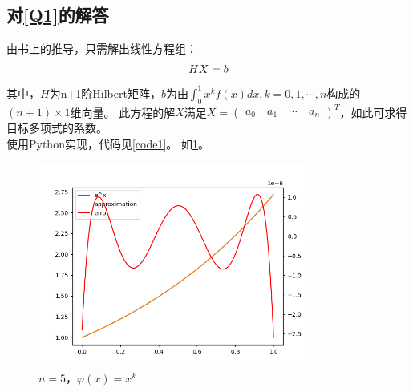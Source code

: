 \documentclass[a4paper,11pt,notitlepage]{article}
\begin{document}
\subsection{对\ref{Q1}的解答}
由书上的推导，只需解出线性方程组：
\begin{equation}
    HX=b\notag
\end{equation}
其中，$H$为n+1阶Hilbert矩阵，$b$为由$\int_{0}^{1}x^{k}f(x)dx,k=0,1,\cdots,n$构成的$(n+1)\times1$维向量。
此方程的解$X$满足$X=\begin{pmatrix}
    a_0\quad a_1\quad \cdots \quad a_n
\end{pmatrix}^{T}$，如此可求得目标多项式的系数。\\
使用Python实现，代码见\cref{code1}。
如\cref{pic:1}。
\begin{figure}[H]
    \centering
    \includegraphics[width=0.8\textwidth]{../picture/Seventh_Week_1A.png}
    \caption{$n=5$，$\varphi(x)=x^{k}$}
    \label{pic:1}
\end{figure}
\end{document}

